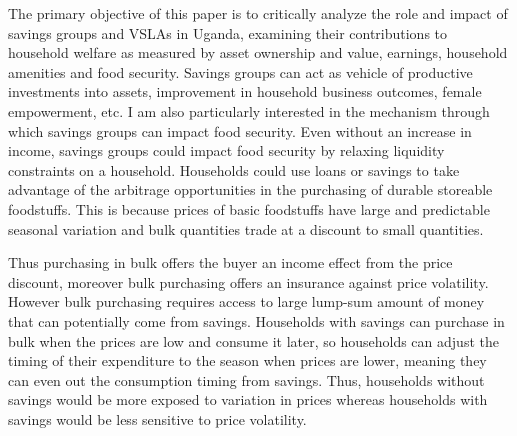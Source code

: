 \documentclass[12pt]{article}
\begin{document}
\hspace{1cm}  The primary objective of this paper is to critically analyze the role and impact of savings groups and VSLAs in Uganda, examining their contributions to household welfare as measured by asset ownership and value, earnings, household amenities and food security. Savings groups can act as vehicle of productive investments into assets, improvement in household business outcomes, female empowerment, etc. I am also particularly interested in the mechanism through which savings groups can impact food security. Even without an increase in income, savings groups could impact food security by relaxing liquidity constraints on a household. Households could use loans or savings to take advantage of the arbitrage opportunities in the purchasing of durable storeable foodstuffs. This is because prices of basic foodstuffs have large and predictable seasonal variation and bulk quantities trade at a discount to small quantities.  

\hspace{1cm} Thus purchasing in bulk offers the buyer an income effect from the price discount, moreover bulk purchasing offers an insurance against price volatility. However bulk purchasing requires access to large lump-sum amount of money that can potentially come from savings. Households with savings can purchase in bulk when the prices are low and consume it later, so households can adjust the timing of their expenditure to the season when prices are lower, meaning they can even out the consumption timing from savings. Thus, households without savings would be more exposed to variation in prices whereas households with savings would be less sensitive to price volatility. 
\end{document}
